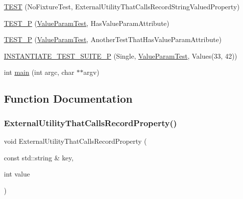 \begin{DoxyCompactItemize}
\item 
\mbox{\hyperlink{_obj__test_2lib_2googletest-master_2googletest_2test_2gtest__xml__output__unittest___8cc_aabb1993df586239008c66c29009a8b72}{T\+E\+ST}} (No\+Fixture\+Test, External\+Utility\+That\+Calls\+Record\+String\+Valued\+Property)
\item 
\mbox{\hyperlink{_obj__test_2lib_2googletest-master_2googletest_2test_2gtest__xml__output__unittest___8cc_a615039c123426f44437f6119fce3333f}{T\+E\+S\+T\+\_\+P}} (\mbox{\hyperlink{class_value_param_test}{Value\+Param\+Test}}, Has\+Value\+Param\+Attribute)
\item 
\mbox{\hyperlink{_obj__test_2lib_2googletest-master_2googletest_2test_2gtest__xml__output__unittest___8cc_a45f95818a41865db8e0209f3f536fab0}{T\+E\+S\+T\+\_\+P}} (\mbox{\hyperlink{class_value_param_test}{Value\+Param\+Test}}, Another\+Test\+That\+Has\+Value\+Param\+Attribute)
\item 
\mbox{\hyperlink{_obj__test_2lib_2googletest-master_2googletest_2test_2gtest__xml__output__unittest___8cc_a1dca731adef470af2e5e1e2fa3b5df68}{I\+N\+S\+T\+A\+N\+T\+I\+A\+T\+E\+\_\+\+T\+E\+S\+T\+\_\+\+S\+U\+I\+T\+E\+\_\+P}} (Single, \mbox{\hyperlink{class_value_param_test}{Value\+Param\+Test}}, Values(33, 42))
\item 
int \mbox{\hyperlink{_obj__test_2lib_2googletest-master_2googletest_2test_2gtest__xml__output__unittest___8cc_a3c04138a5bfe5d72780bb7e82a18e627}{main}} (int argc, char $\ast$$\ast$argv)
\end{DoxyCompactItemize}


\subsection{Function Documentation}
\mbox{\label{_obj__test_2lib_2googletest-master_2googletest_2test_2gtest__xml__output__unittest___8cc_a8a5eb3769c1d7482bf69f3a03862c6a6}} 
\subsubsection{\texorpdfstring{ExternalUtilityThatCallsRecordProperty()}{ExternalUtilityThatCallsRecordProperty()}\hspace{0.1cm}{\footnotesize\ttfamily [1/2]}}
{\footnotesize\ttfamily void External\+Utility\+That\+Calls\+Record\+Property (\begin{DoxyParamCaption}\item[{const std\+::string \&}]{key,  }\item[{int}]{value }\end{DoxyParamCaption})}

